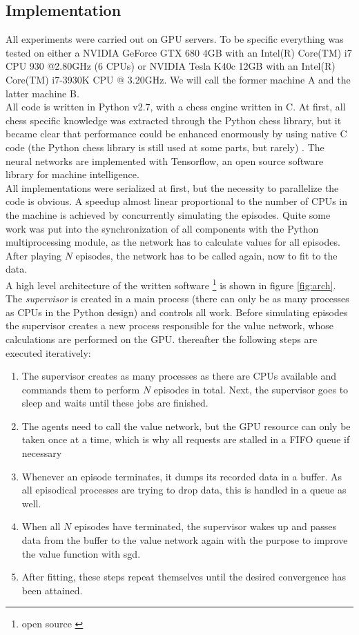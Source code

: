 \subsection{Implementation}
\label{subsec:software}
All experiments were carried out on GPU servers. To be specific everything was tested on either a NVIDIA GeForce GTX 680 4GB with an Intel(R) Core(TM) i7 CPU 930 @2.80GHz (6 CPUs) or NVIDIA Tesla K40c 12GB with an Intel(R) Core(TM) i7-3930K CPU @ 3.20GHz. We will call the former machine A and the latter machine B.\\

All code is written in Python v2.7, with a chess engine written in C. At first, all chess specific knowledge was extracted through the Python chess library, but it became clear that performance could be enhanced enormously by using native C code (the Python chess library is still used at some parts, but rarely) \cite{pychess}. The neural networks are implemented with Tensorflow, an open source software library for machine intelligence.\\

All implementations were serialized at first, but the necessity to parallelize the code is obvious. A speedup almost linear proportional to the number of CPUs in the machine is achieved by concurrently simulating the episodes.  Quite some work was put into the synchronization of all components with the Python multiprocessing module, as the network has to calculate values for all episodes. After playing $N$ episodes, the network has to be called again, now to fit to the data.\\
A high level architecture of the written software \footnote{open source \cite{rookie}} is shown in figure \ref{fig:arch}. The \textit{supervisor} is created in a main process (there can only be as many processes as CPUs in the Python design) and controls all work. Before simulating episodes the supervisor creates a new process responsible for the value network, whose calculations are performed on the GPU. thereafter the following steps are executed iteratively:
\begin{enumerate}
\item The supervisor creates as many processes as there are CPUs available and commands them to perform $N$ episodes in total. Next, the supervisor goes to sleep and waits until these jobs are finished.
\item The agents need to call the value network, but the GPU resource can only be taken once at a time, which is why all requests are stalled in a FIFO queue if necessary
\item Whenever an episode terminates, it dumps its recorded data in a buffer. As all episodical processes are trying to drop data, this is handled in a queue as well.
\item When all $N$ episodes have terminated, the supervisor wakes up and passes data from the buffer to the value network again with the purpose to improve the value function with \gls{sgd}.
\item After fitting, these steps repeat themselves until the desired convergence has been attained.
\end{enumerate}

